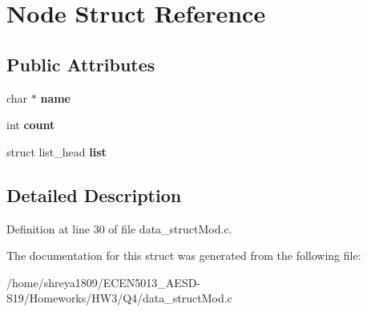 \hypertarget{structNode}{}\section{Node Struct Reference}
\label{structNode}
\subsection*{Public Attributes}
\begin{DoxyCompactItemize}
\item 
\mbox{\label{structNode_a059a0ea6f86dce9fd919c08a707b360b}} 
char $\ast$ {\bfseries name}
\item 
\mbox{\label{structNode_aeff36e03bbb367b048df4e57182cb010}} 
int {\bfseries count}
\item 
\mbox{\label{structNode_ae5cc4d456d668a1d5702089bdcf014fd}} 
struct list\+\_\+head {\bfseries list}
\end{DoxyCompactItemize}


\subsection{Detailed Description}


Definition at line 30 of file data\+\_\+struct\+Mod.\+c.



The documentation for this struct was generated from the following file\+:\begin{DoxyCompactItemize}
\item 
/home/shreya1809/\+E\+C\+E\+N5013\+\_\+\+A\+E\+S\+D-\/\+S19/\+Homeworks/\+H\+W3/\+Q4/data\+\_\+struct\+Mod.\+c\end{DoxyCompactItemize}
